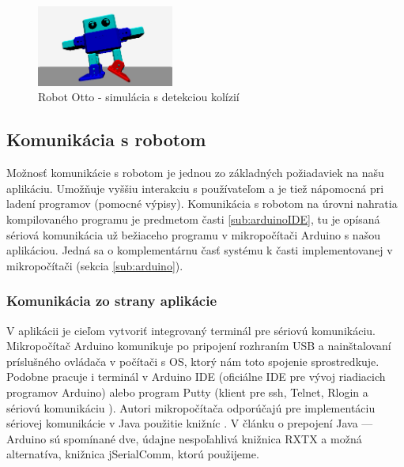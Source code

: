 \begin{figure}
\centerline{\includegraphics[width=0.4\textwidth]{images/otto-with-collision}}
\caption[Robot Otto - simulácia s detekciou kolízií]{Robot Otto - simulácia s detekciou kolízií}
\label{obr:otto-with-collision}
\end{figure}


\subsection{Komunikácia s robotom}
Možnosť komunikácie s robotom je jednou zo základných požiadaviek na našu aplikáciu. Umožňuje vyššiu interakciu s používateľom a je tiež nápomocná pri ladení programov (pomocné výpisy). Komunikácia s robotom na úrovni nahratia kompilovaného programu je predmetom časti \ref{sub:arduinoIDE}, tu je opísaná sériová komunikácia už bežiaceho programu v mikropočítači Arduino s našou aplikáciou. Jedná sa o komplementárnu časť systému k časti implementovanej v mikropočítači (sekcia \ref{sub:arduino}).

\subsubsection{Komunikácia zo strany aplikácie}
V aplikácii je cieľom vytvoriť integrovaný terminál pre sériovú komunikáciu. Mikropočítač Arduino komunikuje po pripojení rozhraním USB a nainštalovaní príslušného ovládača v počítači s OS, ktorý nám toto spojenie sprostredkuje. Podobne pracuje i terminál v Arduino IDE (oficiálne IDE pre vývoj riadiacich programov Arduino) alebo program Putty (klient pre ssh, Telnet, Rlogin a sériovú komunikáciu \cite{putty}). Autori mikropočítača odporúčajú pre implementáciu sériovej komunikácie v Java použitie knižníc \cite{arduinoAndJava}. V článku o prepojení Java --- Arduino sú spomínané dve, údajne nespoľahlivá knižnica RXTX a možná alternatíva, knižnica jSerialComm, ktorú použijeme. 

